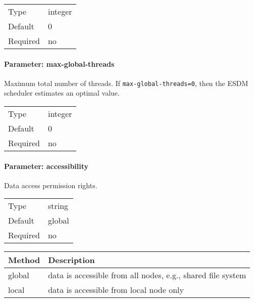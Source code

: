 \begin{preserve}
  \noindent
  \begin{tabular}{ll}
    Type     & integer \\ 
    Default  & 0       \\ 
    Required & no      \\ 
  \end{tabular}
\end{preserve}
\FloatBarrier
\vspace{\gapsize}

\paragraph{Parameter: max-global-threads}
Maximum total number of threads.
If \lstinline|max-global-threads=0|, then the ESDM scheduler estimates an optimal value.

\begin{preserve}
  \noindent
  \begin{tabular}{ll}
    Type     & integer \\ 
    Default  & 0       \\ 
    Required & no      \\ 
  \end{tabular}
\end{preserve}
\FloatBarrier
\vspace{\gapsize}

\paragraph{Parameter: accessibility}
Data access permission rights.

\begin{preserve}
  \noindent
  \begin{tabular}{ll}
    Type     & string \\ 
    Default  & global \\ 
    Required & no     \\ 
  \end{tabular}
\end{preserve}

\begin{preserve}
  \begin{center}
    \begin{tabularx}{\textwidth}{lX}
      Method & Description                                                 \\ 
      \hline
      global & data is accessible from all nodes, e.g., shared file system \\ 
      local  & data is accessible from local node only                     \\ 
    \end{tabularx}
  \end{center}
\end{preserve}
\FloatBarrier
\vspace{\gapsize}

